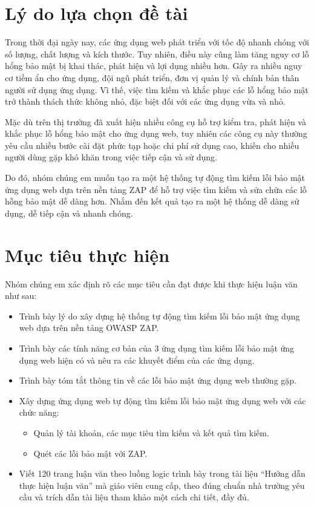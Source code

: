 \section{Lý do lựa chọn đề tài}

\tab Trong thời đại ngày nay, các ứng dụng web phát triển với tốc độ nhanh chóng với số lượng, chất lượng và kích thước.
Tuy nhiên, điều này cũng làm tăng nguy cơ lỗ hổng bảo mật bị khai thác, phát hiện và lợi dụng nhiều hơn.
Gây ra nhiều nguy cơ tiềm ẩn cho ứng dụng, đội ngũ phát triển, đơn vị quản lý và chính bản thân người sử dụng ứng dụng.
Vì thế, việc tìm kiếm và khắc phục các lỗ hổng bảo mật trở thành thách thức không nhỏ, đặc biệt đối với các ứng dụng vừa và nhỏ.
\par

Mặc dù trên thị trường đã xuất hiện nhiều công cụ hỗ trợ kiểm tra, phát hiện và khắc phục lỗ hổng bảo mật cho ứng
dụng web, tuy nhiên các công cụ này thường yêu cầu nhiều bước cài đặt phức tạp hoặc chi phí sử dụng cao, khiến cho nhiều người dùng gặp khó khăn trong việc tiếp cận và sử dụng.
\par

Do đó, nhóm chúng em muốn tạo ra một hệ thống tự động tìm kiếm lỗi bảo mật ứng dụng web dựa trên nền tảng ZAP để hỗ trợ việc tìm kiếm và sửa chữa các lỗ hỗng bảo mật dễ dàng hơn.
Nhắm đến kết quả tạo ra một hệ thống dễ dàng sử dụng, dễ tiếp cận và nhanh chóng.

\section{Mục tiêu thực hiện}

Nhóm chúng em xác định rõ các mục tiêu cần đạt được khi thực hiện luận văn như sau:

\begin{itemize}
    \item Trình bày lý do xây dựng hệ thống tự động tìm kiếm lỗi bảo mật ứng dụng web dựa trên nền tảng OWASP ZAP.
    \item Trình bày các tính năng cơ bản của 3 ứng dụng tìm kiếm lỗi bảo mật ứng dụng web hiện có và nêu ra các khuyết điểm của các ứng dụng.
    \item Trình bày tóm tắt thông tin về các lỗi bảo mật ứng dụng web thường gặp.
    \item Xây dựng ứng dụng web tự động tìm kiếm lỗi bảo mật ứng dụng web với các chức năng:
          \begin{itemize}
              \item Quản lý tài khoản, các mục tiêu tìm kiếm và kết quả tìm kiếm.
              \item Quét các lỗi bảo mật với ZAP.
          \end{itemize}
    \item Viết 120 trang luận văn theo luồng logic trình bày trong tài liệu “Hướng dẫn thực hiện luận văn” mà giáo viên cung cấp, theo đúng chuẩn nhà trường yêu cầu và trích dẫn tài liệu tham khảo một cách chi tiết, đầy đủ.
\end{itemize}

